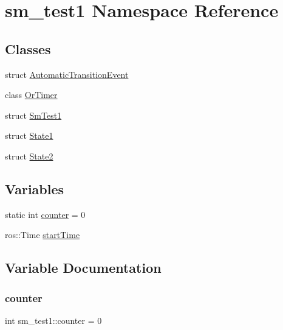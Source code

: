 \hypertarget{namespacesm__test1}{}\section{sm\+\_\+test1 Namespace Reference}
\label{namespacesm__test1}
\subsection*{Classes}
\begin{DoxyCompactItemize}
\item 
struct \hyperlink{structsm__test1_1_1AutomaticTransitionEvent}{Automatic\+Transition\+Event}
\item 
class \hyperlink{classsm__test1_1_1OrTimer}{Or\+Timer}
\item 
struct \hyperlink{structsm__test1_1_1SmTest1}{Sm\+Test1}
\item 
struct \hyperlink{structsm__test1_1_1State1}{State1}
\item 
struct \hyperlink{structsm__test1_1_1State2}{State2}
\end{DoxyCompactItemize}
\subsection*{Variables}
\begin{DoxyCompactItemize}
\item 
static int \hyperlink{namespacesm__test1_a807de4a3a915676ba97cad1d6e0f1318}{counter} = 0
\item 
ros\+::\+Time \hyperlink{namespacesm__test1_abb9998c780883187824713b717353f85}{start\+Time}
\end{DoxyCompactItemize}


\subsection{Variable Documentation}
\mbox{\label{namespacesm__test1_a807de4a3a915676ba97cad1d6e0f1318}} 
\subsubsection{\texorpdfstring{counter}{counter}}
{\footnotesize\ttfamily int sm\+\_\+test1\+::counter = 0\hspace{0.3cm}{\ttfamily [static]}}



